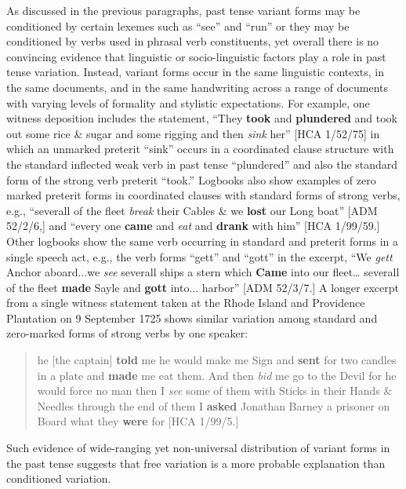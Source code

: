 \begin{styleStandard}
As discussed in the previous paragraphs, past tense variant forms may be conditioned by certain lexemes such as “see” and “run” or they may be conditioned by verbs used in phrasal verb constituents, yet overall there is no convincing evidence that linguistic or socio-linguistic factors play a role in past tense variation. Instead, variant forms occur in the same linguistic contexts, in the same documents, and in the same handwriting across a range of documents with varying levels of formality and stylistic expectations. For example, one witness deposition includes the statement, “They \textbf{took }and \textbf{plundered} and took out some rice \& sugar and some rigging and then \textit{sink} her” [HCA 1/52/75] in which an unmarked preterit “sink” occurs in a coordinated clause structure with the standard inflected weak verb in past tense “plundered” and also the standard form of the strong verb preterit “took.” Logbooks also show examples of zero marked preterit forms in coordinated clauses with standard forms of strong verbs, e.g., “severall of the fleet \textit{break} their Cables \& we\textbf{ lost} our Long boat” [ADM 52/2/6,] and “every one \textbf{came} and \textit{eat} and \textbf{drank} with him” [HCA 1/99/59.] Other logbooks show the same verb occurring in standard and preterit forms in a single speech act, e.g., the verb forms “gett” and “gott” in the excerpt, “We \textit{gett }Anchor aboard...we \textit{see} severall ships a stern which \textbf{Came} into our fleet… severall of the fleet \textbf{made} Sayle and \textbf{gott} into... harbor” [ADM 52/3/7.] A longer excerpt from a single witness statement taken at the Rhode Island and Providence Plantation on 9 September 1725 shows similar variation among standard and zero-marked forms of strong verbs by one speaker:
\end{styleStandard}


\begin{quotation}
he [the captain] \textbf{told} me he would make me Sign and \textbf{sent} for two candles in a plate and \textbf{made} me eat them. And then\textit{ bid} me go to the Devil for he would force no man then I\textit{ see} some of them with Sticks in their Hands \& Needles through the end of them I \textbf{asked} Jonathan Barney a prisoner on Board what they \textbf{were} for [HCA 1/99/5.]

\end{quotation}
\begin{styleStandard}
Such evidence of wide-ranging yet non-universal distribution of variant forms in the past tense suggests that free variation is a more probable explanation than conditioned variation.
\end{styleStandard}


